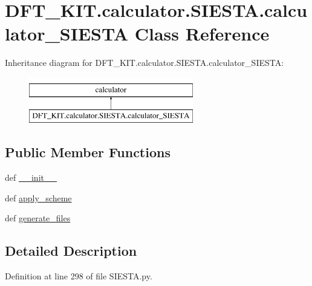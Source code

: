 \hypertarget{class_d_f_t___k_i_t_1_1calculator_1_1_s_i_e_s_t_a_1_1calculator___s_i_e_s_t_a}{\section{D\+F\+T\+\_\+\+K\+I\+T.\+calculator.\+S\+I\+E\+S\+T\+A.\+calculator\+\_\+\+S\+I\+E\+S\+T\+A Class Reference}
\label{class_d_f_t___k_i_t_1_1calculator_1_1_s_i_e_s_t_a_1_1calculator___s_i_e_s_t_a}
}
Inheritance diagram for D\+F\+T\+\_\+\+K\+I\+T.\+calculator.\+S\+I\+E\+S\+T\+A.\+calculator\+\_\+\+S\+I\+E\+S\+T\+A\+:\begin{figure}[H]
\begin{center}
\leavevmode
\includegraphics[height=2.000000cm]{class_d_f_t___k_i_t_1_1calculator_1_1_s_i_e_s_t_a_1_1calculator___s_i_e_s_t_a}
\end{center}
\end{figure}
\subsection*{Public Member Functions}
\begin{DoxyCompactItemize}
\item 
def \hyperlink{class_d_f_t___k_i_t_1_1calculator_1_1_s_i_e_s_t_a_1_1calculator___s_i_e_s_t_a_aaba365f29a7fc8b7d5bb5bd4c2939fb4}{\+\_\+\+\_\+init\+\_\+\+\_\+}
\item 
def \hyperlink{class_d_f_t___k_i_t_1_1calculator_1_1_s_i_e_s_t_a_1_1calculator___s_i_e_s_t_a_a40571d7e78a280b2016e4532af4efcbc}{apply\+\_\+scheme}
\item 
def \hyperlink{class_d_f_t___k_i_t_1_1calculator_1_1_s_i_e_s_t_a_1_1calculator___s_i_e_s_t_a_a175e5b91be01acff708f9d7be2b1156b}{generate\+\_\+files}
\end{DoxyCompactItemize}


\subsection{Detailed Description}


Definition at line 298 of file S\+I\+E\+S\+T\+A.\+py.




